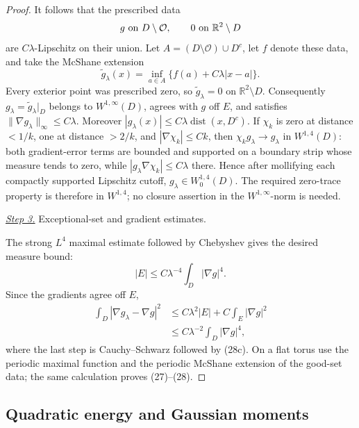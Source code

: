 \documentclass{aomart}
\theoremstyle{definition}
\newcommand{\1}{\mathbf 1}
\begin{document}
\begin{proof}
It follows that the prescribed data
\begin{equation*}
g\ \hbox{on }D\setminus\mathcal O,\qquad
0\ \hbox{on }\mathbb R^2\setminus D
\end{equation*}
are $C\lambda$-Lipschitz on their union.  Let
$A=(D\setminus\mathcal O)\cup D^c$, let $f$ denote these data, and
take the McShane extension
\begin{equation*}
\widetilde g_ \lambda(x)=\inf_ {a\in A}
\{f(a)+C\lambda|x-a|\}.
\end{equation*}
Every exterior point was prescribed zero, so
$\widetilde g_ \lambda=0$ on $\mathbb R^2\setminus D$.
Consequently $g_ \lambda=\widetilde g_ \lambda|_ D$ belongs to
$W^{1,\infty}(D)$, agrees with $g$ off $E$, and satisfies
$\|\nabla g_ \lambda\|_ \infty\leq C\lambda$.  Moreover
$|g_ \lambda(x)|\leq C\lambda\operatorname {dist}(x,D^c)$.
If $\chi_ k$ is zero at distance $<1/k$, one at distance $>2/k$,
and $|\nabla\chi_ k|\leq Ck$, then
$\chi_ kg_ \lambda\to g_ \lambda$ in $W^{1,4}(D)$: both gradient-error
terms are bounded and supported on a boundary strip whose measure tends
to zero, while $|g_ \lambda\nabla\chi_ k|\leq C\lambda$ there.  Hence
after mollifying each compactly supported Lipschitz cutoff,
$g_ \lambda\in W^{1,4}_ 0(D)$.  The required zero-trace property is
therefore in $W^{1,4}$; no closure assertion in the
$W^{1,\infty}$-norm is needed.

\smallskip\noindent
\underline{\textit{Step 3.}} Exceptional-set and gradient estimates.

The strong $L^4$ maximal estimate followed by Chebyshev gives the
desired measure bound:
\begin{equation}
|E|\leq C\lambda^{-4}\int_ D|\nabla g|^4.
\tag{28c}
\end{equation}
Since the gradients agree off $E$,
\begin{equation*}
\begin{split}
\int_ D|\nabla g_ \lambda-\nabla g|^2
&\leq C\lambda^2|E|+C\int_ E|\nabla g|^2\\
&\leq C\lambda^{-2}\int_ D|\nabla g|^4,
\end{split}
\end{equation*}
where the last step is Cauchy--Schwarz followed by (28c).  On a flat
torus use the periodic maximal function and the periodic McShane
extension of the good-set data; the same calculation proves (27)--(28).

\end{proof}

\subsection{Quadratic energy and Gaussian moments}
\end{document}
